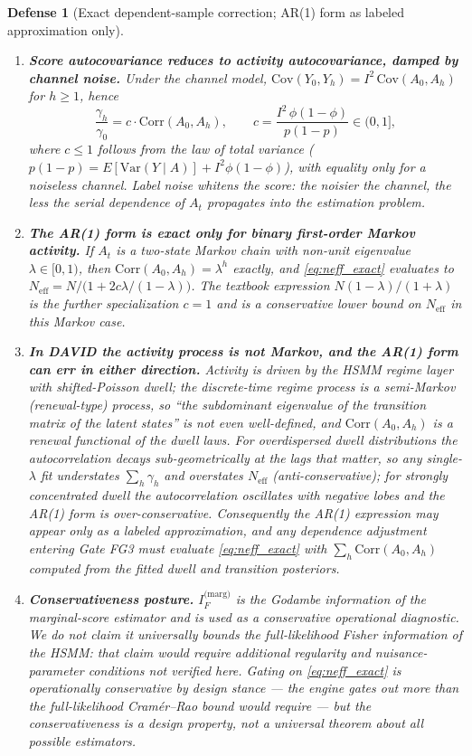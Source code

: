 \documentclass[11pt,a4paper]{article}
\newtheorem{defense}{Defense}
\begin{document}
\begin{defense}[Exact dependent-sample correction; AR(1) form as labeled approximation only]
\begin{enumerate}
    \item \textbf{Score autocovariance reduces to activity autocovariance, damped by channel noise.} Under the channel model, $\mathrm{Cov}(Y_0, Y_h) = I^2 \,\mathrm{Cov}(A_0, A_h)$ for $h \ge 1$, hence
    \[
    \frac{\gamma_h}{\gamma_0} = c \cdot \mathrm{Corr}(A_0, A_h), \qquad c = \frac{I^2\,\phi(1-\phi)}{p(1-p)} \in (0, 1], %
    \]
    where $c \le 1$ follows from the law of total variance ($p(1-p) = E[\mathrm{Var}(Y \mid A)] + I^2 \phi(1-\phi)$), with equality only for a noiseless channel. Label noise \emph{whitens} the score: the noisier the channel, the less the serial dependence of $A_t$ propagates into the estimation problem. %
    \item \textbf{The AR(1) form is exact only for binary first-order Markov activity.} If $A_t$ is a two-state Markov chain with non-unit eigenvalue $\lambda \in [0, 1)$, then $\mathrm{Corr}(A_0, A_h) = \lambda^h$ exactly, and \eqref{eq:neff_exact} evaluates to $N_{\mathrm{eff}} = N / \big(1 + 2c\lambda/(1-\lambda)\big)$. The textbook expression $N(1-\lambda)/(1+\lambda)$ is the further specialization $c = 1$ and is a \emph{conservative lower bound} on $N_{\mathrm{eff}}$ in this Markov case. %
    \item \textbf{In DAVID the activity process is not Markov, and the AR(1) form can err in either direction.} Activity is driven by the HSMM regime layer with shifted-Poisson dwell; the discrete-time regime process is a semi-Markov (renewal-type) process, so ``the subdominant eigenvalue of the transition matrix of the latent states'' is not even well-defined, and $\mathrm{Corr}(A_0, A_h)$ is a renewal functional of the dwell laws. For overdispersed dwell distributions the autocorrelation decays sub-geometrically at the lags that matter, so any single-$\lambda$ fit understates $\sum_h \gamma_h$ and \emph{overstates} $N_{\mathrm{eff}}$ (anti-conservative); for strongly concentrated dwell the autocorrelation oscillates with negative lobes and the AR(1) form is over-conservative. Consequently the AR(1) expression may appear only as a \emph{labeled approximation}, and any dependence adjustment entering Gate FG3 must evaluate \eqref{eq:neff_exact} with $\sum_h \mathrm{Corr}(A_0, A_h)$ computed from the fitted dwell and transition posteriors. %
    \item \textbf{Conservativeness posture.} $I_F^{\text{(marg)}}$ is the Godambe information of the marginal-score estimator and is used as a conservative operational diagnostic. We do not claim it universally bounds the full-likelihood Fisher information of the HSMM: that claim would require additional regularity and nuisance-parameter conditions not verified here. Gating on \eqref{eq:neff_exact} is operationally conservative by design stance --- the engine gates out more than the full-likelihood Cramér--Rao bound would require --- but the conservativeness is a design property, not a universal theorem about all possible estimators. %

\end{enumerate}
\end{defense}
\end{document}
